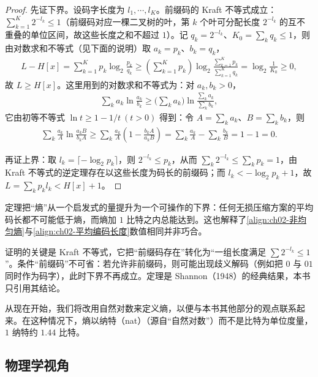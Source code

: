 \documentclass[../../main.tex]{subfiles}
\begin{document}
\begin{proof}
先证下界。设码字长度为 $l_1,\cdots,l_K$。前缀码的 Kraft 不等式成立：$\sum_{k=1}^{K}2^{-l_k}\leqslant1$（前缀码对应一棵二叉树的叶，第 $k$ 个叶可分配长度 $2^{-l_k}$ 的互不重叠的单位区间，故这些长度之和不超过 $1$）。记 $q_k=2^{-l_k}$、$K_0=\sum_kq_k\leqslant1$，则由对数求和不等式（见下面的说明）取 $a_k=p_k$、$b_k=q_k$，
\begin{align*}
  L - H[x] = \sum_{k=1}^{K}p_k\log_2\frac{p_k}{q_k}
  \geqslant \left(\sum_{k=1}^{K}p_k\right)\log_2\frac{\sum_{k=1}^{K}p_k}{\sum_{k=1}^{K}q_k}
  = \log_2\frac{1}{K_0} \geqslant 0 ,
\end{align*}
故 $L\geqslant H[x]$。这里用到的对数求和不等式为：对 $a_k,b_k>0$，
\begin{align*}
  \sum_k a_k\ln\frac{a_k}{b_k} \geqslant \Big(\sum_k a_k\Big)\ln\frac{\sum_k a_k}{\sum_k b_k} ,
\end{align*}
它由初等不等式 $\ln t\geqslant1-1/t\ (t>0)$ 得到：令 $A=\sum_ka_k$、$B=\sum_kb_k$，则
\begin{align*}
  \sum_k\frac{a_k}{A}\ln\frac{a_kB}{b_kA}
  \geqslant \sum_k\frac{a_k}{A}\left(1-\frac{b_kA}{a_kB}\right)
  = \sum_k\frac{a_k}{A} - \sum_k\frac{b_k}{B} = 1-1 = 0 .
\end{align*}

再证上界：取 $l_k=\lceil-\log_2p_k\rceil$，则 $2^{-l_k}\leqslant p_k$，从而 $\sum_k2^{-l_k}\leqslant\sum_kp_k=1$，由 Kraft 不等式的逆定理存在以这些长度为码长的前缀码；而 $l_k<-\log_2p_k+1$，故 $L=\sum_kp_kl_k<H[x]+1$。
\end{proof}

\begin{remark}
定理把“熵”从一个启发式的量提升为一个可操作的下界：任何无损压缩方案的平均码长都不可能低于熵，而熵加 $1$ 比特之内总能达到。这也解释了\eqref{align:ch02-非均匀熵}与\eqref{align:ch02-平均编码长度}数值相同并非巧合。

证明的关键是 Kraft 不等式，它把“前缀码存在”转化为“一组长度满足 $\sum2^{-l_k}\leqslant1$”。条件“前缀码”不可省：若允许非前缀码，则可能出现歧义解码（例如把 $0$ 与 $01$ 同时作为码字），此时下界不再成立。定理是 Shannon（1948）的经典结果，本书只引用其结论。
\end{remark}

从现在开始，我们将改用自然对数来定义熵，以便与本书其他部分的观点联系起来。在这种情况下，熵以纳特（nat）（源自“自然对数”）而不是比特为单位度量，$1$ 纳特约 $1.44$ 比特。

\subsection{物理学视角}\label{subsection:ch02-物理学视角}
\end{document}
